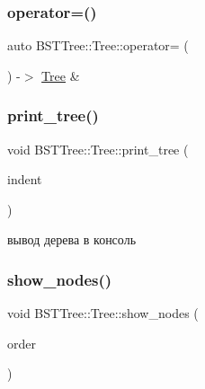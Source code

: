 \mbox{\label{class_b_s_t_tree_1_1_tree_aa71187977d9e86293e250214bb53f423}} 
\subsubsection{\texorpdfstring{operator=()}{operator=()}\hspace{0.1cm}{\footnotesize\ttfamily [2/2]}}
{\footnotesize\ttfamily auto B\+S\+T\+Tree\+::\+Tree\+::operator= (\begin{DoxyParamCaption}\item[{\mbox{\hyperlink{class_b_s_t_tree_1_1_tree}{Tree}} \&\&}]{ }\end{DoxyParamCaption}) -\/$>$  \mbox{\hyperlink{class_b_s_t_tree_1_1_tree}{Tree}} \&}

\mbox{\label{class_b_s_t_tree_1_1_tree_aaa4094ca75c834acc9dbd1201791450e}} 
\subsubsection{\texorpdfstring{print\+\_\+tree()}{print\_tree()}}
{\footnotesize\ttfamily void B\+S\+T\+Tree\+::\+Tree\+::print\+\_\+tree (\begin{DoxyParamCaption}\item[{int}]{indent }\end{DoxyParamCaption})}

вывод дерева в консоль \mbox{\label{class_b_s_t_tree_1_1_tree_a122d418f295da0b66ae050174e74a828}} 
\subsubsection{\texorpdfstring{show\+\_\+nodes()}{show\_nodes()}}
{\footnotesize\ttfamily void B\+S\+T\+Tree\+::\+Tree\+::show\+\_\+nodes (\begin{DoxyParamCaption}\item[{\mbox{\hyperlink{namespace_b_s_t_tree_a711723b85e5af09e10bfcc3a3b501fe2}{B\+S\+T\+Tree\+::traversal\+\_\+order}}}]{order }\end{DoxyParamCaption})}



